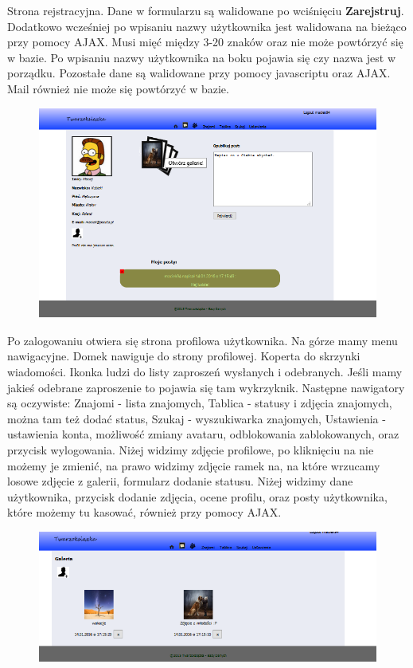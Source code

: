 \documentclass[a4paper,10pt,table]{article}
\begin{document}
Strona rejstracyjna. Dane w formularzu są walidowane po wciśnięciu \textbf{Zarejstruj}. Dodatkowo wcześniej po wpisaniu nazwy użytkownika jest walidowana na bieżąco przy pomocy AJAX. Musi mięć między 3-20 znaków oraz nie może powtórzyć się w bazie. Po wpisaniu nazwy użytkownika na boku pojawia się czy nazwa jest w porządku. Pozostałe dane są walidowane przy pomocy javascriptu oraz AJAX. Mail również nie może się powtórzyć w bazie.
\newpage
\begin{figure}[h]
\begin{center}
\includegraphics[scale=0.6]{scrn/3}
\end{center}
\end{figure}
Po zalogowaniu otwiera się strona profilowa użytkownika. Na górze mamy menu nawigacyjne. Domek nawiguje do strony profilowej. Koperta do skrzynki wiadomości. Ikonka ludzi do listy zaproszeń wysłanych i odebranych. Jeśli mamy jakieś odebrane zaproszenie to pojawia się tam wykrzyknik. Następne nawigatory są oczywiste: Znajomi - lista znajomych, Tablica - statusy i zdjęcia znajomych, można tam też dodać status, Szukaj - wyszukiwarka znajomych, Ustawienia - ustawienia konta, możliwość zmiany avataru, odblokowania zablokowanych, oraz przycisk wylogowania. Niżej widzimy zdjęcie profilowe, po kliknięciu na nie możemy je zmienić, na prawo widzimy zdjęcie ramek na, na które wrzucamy losowe zdjęcie z galerii, formularz dodanie statusu. Niżej widzimy dane użytkownika, przycisk dodanie zdjęcia, ocene profilu, oraz posty użytkownika, które możemy tu kasować, również przy pomocy AJAX.
\begin{figure}[h]
\begin{center}
\includegraphics[scale=0.6]{scrn/4}
\end{center}
\end{figure}
\end{document}
